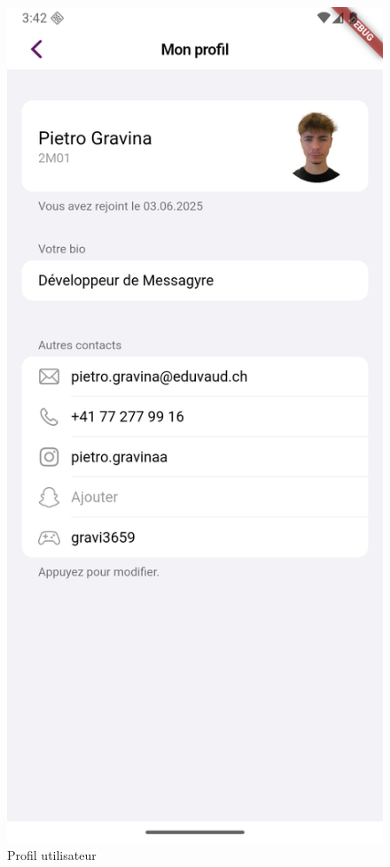\documentclass[12pt]{report}
\begin{document}
\begin{itemize}
	\begin{figure}[H]
		\centering
		\begin{minipage}[t]{0.5\textwidth}
			\centering
			\includegraphics[width=\textwidth]{img/profile.png}
			\caption{Profil utilisateur}
		\end{minipage}
	\end{figure}
	

\end{itemize}
\end{document}
